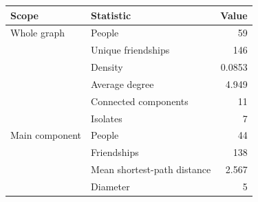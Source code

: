 \begin{tabular}{llr}
\toprule
Scope & Statistic & Value \\
\midrule
Whole graph & People & 59 \\
 & Unique friendships & 146 \\
 & Density & 0.0853 \\
 & Average degree & 4.949 \\
 & Connected components & 11 \\
 & Isolates & 7 \\
Main component & People & 44 \\
 & Friendships & 138 \\
 & Mean shortest-path distance & 2.567 \\
 & Diameter & 5 \\
\bottomrule
\end{tabular}
